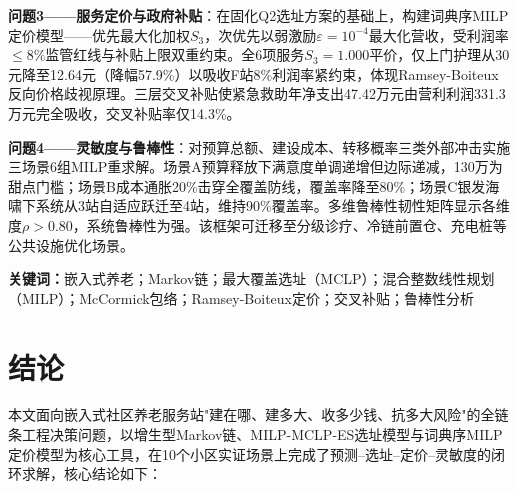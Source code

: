 \documentclass[12pt,a4paper]{ctexart}
\begin{document}
\textbf{问题3——服务定价与政府补贴}：在固化Q2选址方案的基础上，构建词典序MILP定价模型——优先最大化加权$S_3$，次优先以弱激励$\varepsilon=10^{-4}$最大化营收，受利润率$\le8\%$监管红线与补贴上限双重约束。全6项服务$S_3=1.000$平价，仅上门护理从30元降至12.64元（降幅57.9\%）以吸收F站8\%利润率紧约束，体现Ramsey-Boiteux反向价格歧视原理。三层交叉补贴使紧急救助年净支出47.42万元由营利利润331.3万元完全吸收，交叉补贴率仅14.3\%。

\textbf{问题4——灵敏度与鲁棒性}：对预算总额、建设成本、转移概率三类外部冲击实施三场景6组MILP重求解。场景A预算释放下满意度单调递增但边际递减，130万为甜点门槛；场景B成本通胀20\%击穿全覆盖防线，覆盖率降至80\%；场景C银发海啸下系统从3站自适应跃迁至4站，维持90\%覆盖率。多维鲁棒性韧性矩阵显示各维度$\rho>0.80$，系统鲁棒性为强。该框架可迁移至分级诊疗、冷链前置仓、充电桩等公共设施优化场景。

\textbf{关键词：}嵌入式养老；Markov链；最大覆盖选址（MCLP）；混合整数线性规划（MILP）；McCormick包络；Ramsey-Boiteux定价；交叉补贴；鲁棒性分析

\newpage





















\section{结论}

本文面向嵌入式社区养老服务站"建在哪、建多大、收多少钱、抗多大风险"的全链条工程决策问题，以增生型Markov链、MILP-MCLP-ES选址模型与词典序MILP定价模型为核心工具，在10个小区实证场景上完成了预测--选址--定价--灵敏度的闭环求解，核心结论如下：
\end{document}
